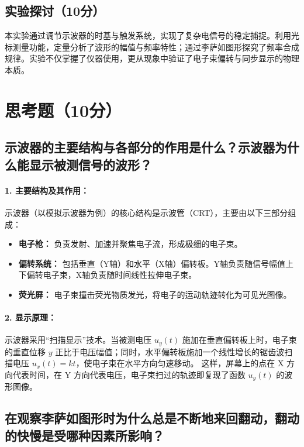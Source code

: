 \documentclass[]{../../templates/Report}%
\begin{document}
\subsection{实验探讨（10分）}

本实验通过调节示波器的时基与触发系统，实现了复杂电信号的稳定捕捉。利用光标测量功能，定量分析了波形的幅值与频率特性；通过李萨如图形探究了频率合成规律。实验不仅掌握了仪器使用，更从现象中验证了电子束偏转与同步显示的物理本质。
\section{思考题（10分）}

\subsection{示波器的主要结构与各部分的作用是什么？示波器为什么能显示被测信号的波形？}

\paragraph{1. 主要结构及其作用：}
示波器（以模拟示波器为例）的核心结构是示波管（CRT），主要由以下三部分组成：
\begin{itemize}
    \item \textbf{电子枪：} 负责发射、加速并聚焦电子流，形成极细的电子束。
    \item \textbf{偏转系统：} 包括垂直（Y轴）和水平（X轴）偏转板。Y轴负责随信号幅值上下偏转电子束，X轴负责随时间线性拉伸电子束。
    \item \textbf{荧光屏：} 电子束撞击荧光物质发光，将电子的运动轨迹转化为可见光图像。
\end{itemize}

\paragraph{2. 显示原理：}
示波器采用“扫描显示”技术。当被测电压 $u_y(t)$ 施加在垂直偏转板上时，电子束的垂直位移 $y$ 正比于电压幅值；同时，水平偏转板施加一个线性增长的锯齿波扫描电压 $u_x(t) = kt$，使电子束在水平方向匀速移动。
这样，屏幕上的点在 X 方向代表时间，在 Y 方向代表电压，电子束扫过的轨迹即复现了函数 $u_y(t)$ 的波形图像。

\subsection{在观察李萨如图形时为什么总是不断地来回翻动，翻动的快慢是受哪种因素所影响？}
\end{document}
